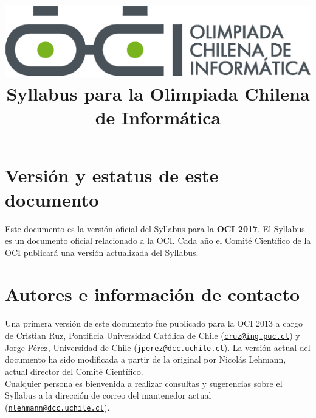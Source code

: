 \documentclass{article}
\begin{document}
\title{
    \includegraphics[scale=0.2]{OCIlogo.eps}\\
    \vskip 20pt
    Syllabus para la Olimpiada Chilena de Informática}
\date{}
\maketitle

\section{Versión y estatus de este documento}
Este documento es la versión oficial del Syllabus para la \textbf{OCI 2017}.
El Syllabus es un documento oficial relacionado a la OCI.
Cada año el Comité Científico de la OCI publicará una versión actualizada del Syllabus.

\section{Autores e información de contacto}
Una primera versión de este documento fue publicado para la OCI 2013 a cargo de
Cristian Ruz, Pontificia Universidad Católica de Chile (\href{mailto:cruz@ing.puc.cl}{\nolinkurl{cruz@ing.puc.cl}}) y
Jorge Pérez, Universidad de Chile (\href{mailto:jperez@dcc.uchile.cl}{\nolinkurl{jperez@dcc.uchile.cl}}).
La versión actual del documento ha sido modificada a partir de la original por Nicolás Lehmann, actual director del Comité Científico.\\

Cualquier persona es bienvenida a realizar consultas y sugerencias sobre el
Syllabus a la dirección de correo del mantenedor actual (\href{mailto:nlehmann@dcc.uchile.cl}{\nolinkurl{nlehmann@dcc.uchile.cl}}).
\end{document}
